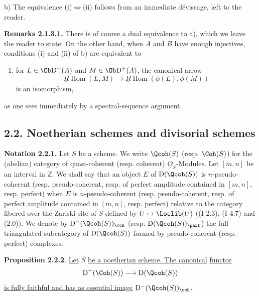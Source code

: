 b) The equivalence (i)$\Leftrightarrow$(ii) follows from an immediate dévissage, left to the reader.

\textbf{Remarks 2.1.3.1.} There is of course a dual equivalence to a), which we leave the reader to state. On the other hand, when $A$ and $B$ have enough injectives, conditions (i) and (ii) of b) are equivalent to
\begin{enumerate}[label=(\roman*),start=3]
\item for $L\in\Ob\mathrm D^{-}(A)$ and $M\in\Ob\mathrm D^{+}(A)$, the canonical arrow
\[
\underline{\underline{R}}\!\operatorname{Hom}(L,M)\longrightarrow
\underline{\underline{R}}\!\operatorname{Hom}(\phi(L),\phi(M))
\]
is an isomorphism,
\end{enumerate}
as one sees immediately by a spectral-sequence argument.

\subsection*{2.2. Noetherian schemes and divisorial schemes}

\textbf{Notation 2.2.1.} Let $S$ be a scheme. We write $\Qcoh(S)$ (resp. $\Coh(S)$) for the (abelian) category of quasi-coherent (resp. coherent) $\underline{O}_S$-Modules. Let $[m,n]$ be an interval in $\mathbb Z$. We shall say that an object $E$ of $\mathrm D(\Qcoh(S))$ is $n$-pseudo-coherent (resp. pseudo-coherent, resp. of perfect amplitude contained in $[m,n]$, resp. perfect) when $E$ is $n$-pseudo-coherent (resp. pseudo-coherent, resp. of perfect amplitude contained in $[m,n]$, resp. perfect) relative to the category fibered over the Zariski site of $S$ defined by $U\mapsto\Loclib(U)$ ((I 2.3), (I 4.7) and (2.0)). We denote by $\mathrm D^{-}(\Qcoh(S))_{\coh}$ (resp. $\mathrm D(\Qcoh(S))_{\parf}$) the full triangulated subcategory of $\mathrm D(\Qcoh(S))$ formed by pseudo-coherent (resp. perfect) complexes.

\textbf{Proposition 2.2.2}. \uline{Let} $S$ \uline{be a noetherian scheme. The canonical}
\uline{functor}
%
\[
\mathrm D^{-}(\Coh(S))\longrightarrow \mathrm D(\Qcoh(S))
\]
\uline{is fully faithful and has as essential image} $\mathrm D^{-}(\Qcoh(S))_{\coh}$.


